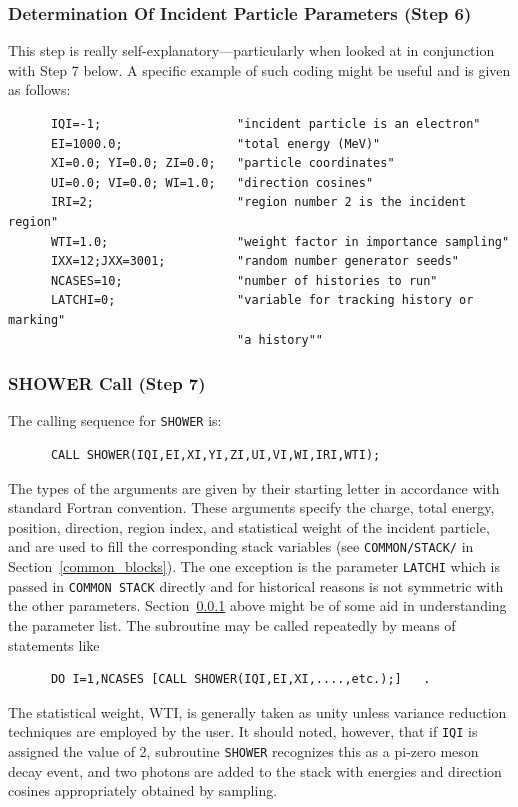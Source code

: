 \subsubsection{Determination Of Incident Particle Parameters (Step 6)}
\label{step_6}


This step is really self-explanatory---particularly when looked at in
conjunction with Step 7 below.  A specific example of such coding might be
useful and is given as follows:
\begin{verbatim}
      IQI=-1;                   "incident particle is an electron"
      EI=1000.0;                "total energy (MeV)"
      XI=0.0; YI=0.0; ZI=0.0;   "particle coordinates"
      UI=0.0; VI=0.0; WI=1.0;   "direction cosines"
      IRI=2;                    "region number 2 is the incident region"
      WTI=1.0;                  "weight factor in importance sampling"
      IXX=12;JXX=3001;          "random number generator seeds"
      NCASES=10;                "number of histories to run"
      LATCHI=0;                 "variable for tracking history or marking"
                                "a history""
\end{verbatim}

\subsubsection{SHOWER Call (Step 7)}
\label{step_7}

The calling sequence for {\tt SHOWER} is:
\begin{verbatim}
      CALL SHOWER(IQI,EI,XI,YI,ZI,UI,VI,WI,IRI,WTI);
\end{verbatim}
The types of the arguments are given by their starting letter in accordance
with standard Fortran convention.  These arguments specify the charge,
total energy, position, direction, region index, and statistical weight of
the incident particle, and are used to fill the corresponding stack
variables (see {\tt COMMON/STACK/} in Section~\ref{common_blocks}).  The
one exception is the parameter {\tt LATCHI} which is passed in {\tt COMMON
STACK} directly and for historical reasons is not symmetric with the other
parameters.  Section~\ref{step_6} above might be of some aid in
understanding the parameter list.  The subroutine may be called repeatedly
by means of statements like
\begin{verbatim}
      DO I=1,NCASES [CALL SHOWER(IQI,EI,XI,....,etc.);]   .
\end{verbatim}
The statistical weight, WTI, is generally taken as unity unless variance
reduction techniques are employed by the user.  It should noted, however,
that if {\tt IQI} is assigned the value of 2, subroutine {\tt SHOWER} recognizes this
as a pi-zero meson decay event, and two photons are added to the stack with
energies and direction cosines appropriately obtained by sampling.


